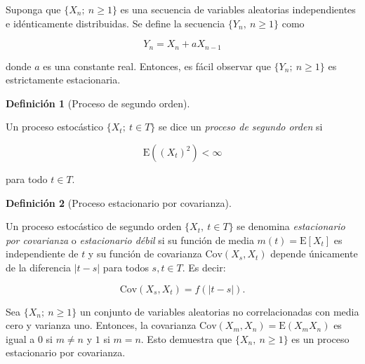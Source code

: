 \documentclass[
  us-letterpaper,
]{scrreprt}
\theoremstyle{plain}
\theoremstyle{definition}
\newtheorem{definition}{Definición}[chapter]
\theoremstyle{definition}
\theoremstyle{plain}
\theoremstyle{remark}
\begin{document}
\begin{tcolorbox}[enhanced jigsaw, breakable, colbacktitle=quarto-callout-caution-color!10!white, rightrule=.15mm, toptitle=1mm, colback=white, left=2mm, colframe=quarto-callout-caution-color-frame, bottomtitle=1mm, opacitybacktitle=0.6, leftrule=.75mm, arc=.35mm, title={Ejemplo}, coltitle=black, titlerule=0mm, opacityback=0, bottomrule=.15mm, toprule=.15mm]

Suponga que \(\{X_n;\ n \geq 1\}\) es una secuencia de variables
aleatorias independientes e idénticamente distribuidas. Se define la
secuencia \(\{Y_n,\ n \geq 1\}\) como

\[
Y_n=X_n+aX_{n-1}
\]

donde \(a\) es una constante real. Entonces, es fácil observar que
\(\{Y_n;\ n \geq 1\}\) es estrictamente estacionaria.

\end{tcolorbox}

\begin{definition}[Proceso de segundo
orden]\protect\hypertarget{def-SOP}{}\label{def-SOP}

Un proceso estocástico \(\{X_t;\ t\in T\}\) se dice un \emph{proceso de
segundo orden} si

\[
\mathrm{E}((X_t)^2)< \infty
\]

para todo \(t\in T\).

\end{definition}

\begin{definition}[Proceso estacionario por
covarianza]\protect\hypertarget{def-PEC}{}\label{def-PEC}

Un proceso estocástico de segundo orden \(\{X_t,\ t \in T\}\) se
denomina \emph{estacionario por covarianza} o \emph{estacionario débil}
si su función de media \(m(t) = \mathrm{E}[X_t]\) es independiente de
\(t\) y su función de covarianza \(\mathrm{Cov}(X_s, X_t)\) depende
únicamente de la diferencia \(|t - s|\) para todos \(s, t \in T\). Es
decir:

\[
\mathrm{Cov}(X_s,X_t)=f(|t-s|).
\]

\end{definition}

\begin{tcolorbox}[enhanced jigsaw, breakable, colbacktitle=quarto-callout-caution-color!10!white, rightrule=.15mm, toptitle=1mm, colback=white, left=2mm, colframe=quarto-callout-caution-color-frame, bottomtitle=1mm, opacitybacktitle=0.6, leftrule=.75mm, arc=.35mm, title={Ejemplo}, coltitle=black, titlerule=0mm, opacityback=0, bottomrule=.15mm, toprule=.15mm]

Sea \(\{X_n;\ n \geq 1\}\) un conjunto de variables aleatorias no
correlacionadas con media cero y varianza uno. Entonces, la covarianza
\(\mathrm{Cov}(X_m, X_n) = \mathrm{E}(X_mX_n)\) es igual a \(0\) si
\(m \ne n\) y \(1\) si \(m = n\). Esto demuestra que
\(\{X_n,\ n \ge 1\}\) es un proceso estacionario por covarianza.

\end{tcolorbox}
\end{document}
